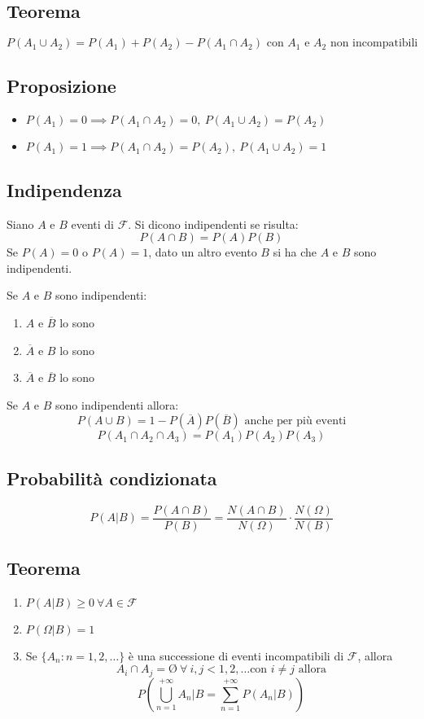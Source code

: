 \subsection*{Teorema}
$$P(A_1 \cup A_2) = P(A_1) + P(A_2) - P(A_1 \cap A_2) \text{ con $A_1$ e $A_2$ non incompatibili}$$

\subsection*{Proposizione}
\begin{itemize}
    \item $P(A_1) = 0 \implies P(A_1 \cap A_2) = 0, \ P(A_1 \cup A_2) = P(A_2)$
    \item $P(A_1) = 1 \implies P(A_1 \cap A_2) = P(A_2), \ P(A_1 \cup A_2) = 1$
\end{itemize}

\subsection*{Indipendenza}
Siano $A$ e $B$ eventi di $\mathscr{F}$. Si dicono indipendenti se risulta:
$$P(A \cap B) = P(A)P(B)$$
Se $P(A) = 0$ o $P(A) = 1$, dato un altro evento $B$ si ha che $A$ e $B$ sono indipendenti.

Se $A$ e $B$ sono indipendenti:
\begin{enumerate}
    \item $A$ e $\overline{B}$ lo sono
    \item $\overline{A}$ e $B$ lo sono
    \item $\overline{A}$ e $\overline{B}$ lo sono
\end{enumerate}
Se $A$ e $B$ sono indipendenti allora:
$$P(A \cup B) = 1 - P(\overline{A})P(\overline{B})\text{ anche per più eventi}$$
$$P(A_1 \cap A_2 \cap A_3) = P(A_1)P(A_2)P(A_3)$$

\subsection*{Probabilità condizionata}
$$
P(A|B) = \frac{P(A \cap B)}{P(B)} = \frac{N(A \cap B)}{N(\Omega)} \cdot \frac{N(\Omega)}{N(B)}
$$

\subsection*{Teorema}
\begin{enumerate}
    \item $P(A|B) \ge 0 \ \forall A \in \mathscr{F}$
    \item $P(\Omega | B) = 1$
    \item Se $\{A_n: n = 1,2,\dots\}$ è una successione di eventi
    incompatibili di $\mathscr{F}$, allora
    $$A_i \cap A_j = \text{\O} \ \forall \ i,j < 1,2,\dots \text{con } i \neq j \text{ allora}$$
    $$P \left(\bigcup^{+\infty}_{n=1} A_n | B = \sum_{n=1}^{+\infty}P(A_n | B) \right)$$
\end{enumerate}

